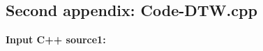 \documentclass[12pt,a4paper]{article}
\theoremstyle{definition}
\begin{document}
\newpage

\begin{appendices}
\section{Second appendix: Code-DTW.cpp}
\textcolor[rgb]{0.98,0.00,0.00}{\textbf{Input C++ source1:}}




%

\end{appendices}

\newpage
\end{document}
